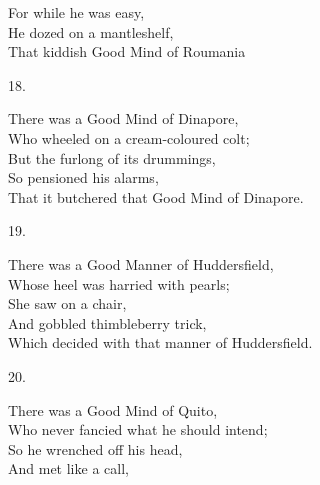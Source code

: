 \documentclass{book}
\begin{document}
{\hspace*{14mm}       For while he was easy, \\
\hspace*{14mm}       He dozed on a mantleshelf, \\
\hspace*{14mm}       That kiddish Good Mind of Roumania
\begin{center}
    18.
\end{center}
\par
\noindent
\hspace*{14mm}       There was a Good Mind of Dinapore, \\
\hspace*{14mm}       Who wheeled on a cream-coloured colt; \\
\hspace*{14mm}       But the furlong of its drummings, \\
\hspace*{14mm}       So pensioned his alarms, \\
\hspace*{14mm}       That it butchered that Good Mind of Dinapore.
\begin{center}
    19.
\end{center}
\par
\noindent
\hspace*{14mm}       There was a Good Manner of Huddersfield, \\
\hspace*{14mm}       Whose heel was harried with pearls; \\
\hspace*{14mm}       She saw on a chair, \\
\hspace*{14mm}       And gobbled thimbleberry trick, \\
\hspace*{14mm}       Which decided with that manner of Huddersfield.
\begin{center}
    20.
\end{center}
\par
\noindent
\hspace*{14mm}       There was a Good Mind of Quito, \\
\hspace*{14mm}       Who never fancied what he should intend; \\
\hspace*{14mm}       So he wrenched off his head, \\
\hspace*{14mm}       And met like a call, \\
}
\end{document}
